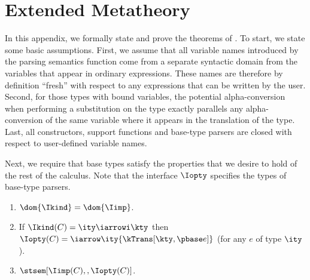 \appendix
\section{Extended Metatheory}
\label{app:ddc-meta-theory}
In this appendix, we formally state and prove the theorems
of . To start, we state some basic
assumptions.  First, we assume that all variable names
introduced by the parsing semantics function come from a separate
syntactic domain from the variables that appear in ordinary
expressions. These names are therefore by definition ``fresh'' with respect
to any expressions that can be written by the user.  Second, for those
types with bound variables, the potential alpha-conversion when
performing a substitution on the type exactly parallels any
alpha-conversion of the same variable where it appears in the
translation of the type. Last, all constructors, support functions and
base-type parsers are closed with respect to user-defined variable
names.

Next, we require that \ddc{} base types satisfy the properties that we
desire to hold of the rest of the calculus.  Note that the interface $\Iopty$ specifies the types of base-type parsers.

\begin{condition}
\label{cond:base-types}
  \begin{enumerate}
  \item $\dom {\Ikind} = \dom {\Iimp}$.
  \item If $\Ikind(C) = {\ity \iarrowi \kty}$ then $\Iopty(C) =
    \iarrow \ity {\kTrans[\kty,\pbase e]}$ (for any $e$ of type $\ity$).
  \item $\stsem[\Iimp(C),,\Iopty(C)]$.
    \label{cond:closed-op}
  \end{enumerate}
\end{condition}

